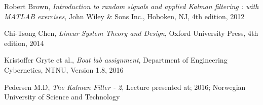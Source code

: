 \begin{thebibliography}{9}
  Robert Brown, 
  \emph{Introduction to random signals and applied Kalman filtering :  with MATLAB exercises},
  John Wiley \& Sons Inc., 
  Hoboken, 
  NJ, 
  4th edition, 
  2012

  Chi-Tsong Chen,
  \emph{Linear System Theory and Design},
  Oxford University Press,
  4th edition,
  2014
  
  Kristoffer Gryte et al.,
  \emph{Boat lab assignment},
  Department of Engineering Cybernetics,
  NTNU,
  Version 1.8,
  2016

  Pedersen M.D,
  \emph{The Kalman Filter - 2},
  Lecture presented at; 2016; Norwegian University of Science and Technology    
\end{thebibliography}